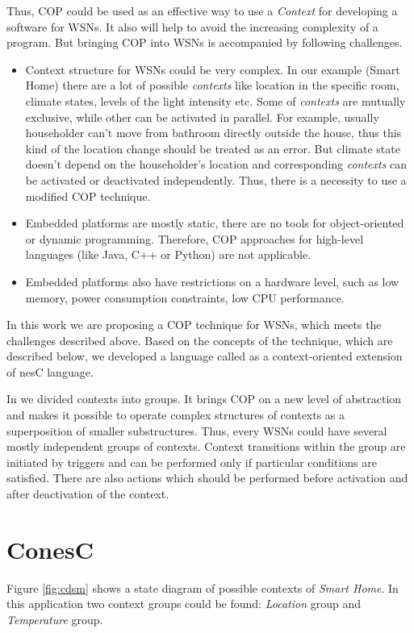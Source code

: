 \documentclass{ubicomp-ext}
\begin{document}
Thus, COP could be used as an effective way to use a \textit{Context} for developing a software for WSNs. It also will help to avoid the increasing complexity of a program. But bringing COP into WSNs is accompanied by following challenges.
\begin{itemize}\compresslist
\item
Context structure for WSNs could be very complex. In our example (Smart Home) there are a lot of possible \textit{contexts} like location in the specific room, climate states, levels of the light intensity etc. Some of \textit{contexts} are mutually exclusive, while other can be activated in parallel. For example, usually householder can't move from bathroom directly outside the house, thus this kind of the location change should be treated as an error. But climate state doesn't depend on the householder's location and corresponding \textit{contexts} can be activated or deactivated independently. Thus, there is a necessity to use a modified COP technique.
\item
Embedded platforms are mostly static, there are no tools for object-oriented or dynamic programming. Therefore, COP approaches for high-level languages (like Java, C++ or Python) are not applicable. 
\item
Embedded platforms also have restrictions on a hardware level, such as low memory, power consumption constraints, low CPU performance.
\end{itemize}

In this work we are proposing a COP technique for WSNs, which meets the challenges described above. Based on the concepts of the technique, which are described below, we developed a language called {} as a context-oriented extension of nesC language.

In {} we divided contexts into groups. It brings COP on a new level of abstraction and makes it possible to operate complex structures of contexts as a superposition of smaller substructures. Thus, every WSNs could have several mostly independent groups of contexts. Context transitions within the group are initiated by triggers and can be performed only if particular conditions are satisfied. There are also actions which should be performed before activation and after deactivation of the context.
\section{ConesC}
Figure \ref{fig:cdsm} shows a state diagram of possible contexts of \textit{Smart Home}. In this application two context groups could be found: \textit{Location} group and \textit{Temperature} group.
\end{document}
